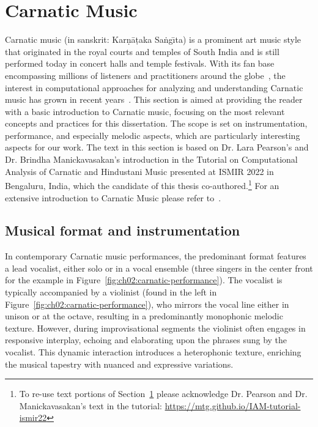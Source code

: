 \section{Carnatic Music}\label{ch02_sb:sec:carnatic}
Carnatic music (in sanskrit: Kar\d{n}\={a}\d{t}aka Sa\.{n}g\={\i}ta) is a prominent art music style that originated in the royal courts and temples of South India and is still performed today in concert halls and temple festivals. With its fan base encompassing millions of listeners and practitioners around the globe~\citep{gulati-mining}, the interest in computational approaches for analyzing and understanding Carnatic music has grown in recent years~\citep{tzanetakis-ethnomusicology}. This section is aimed at providing the reader with a basic introduction to Carnatic music, focusing on the most relevant concepts and practices for this dissertation. 
%
The scope is set on instrumentation, performance, and especially melodic aspects, which are particularly interesting aspects for our work.
%
The text in this section is based on Dr. Lara Pearson's and Dr. Brindha Manickavasakan's introduction in the Tutorial on Computational Analysis of Carnatic and Hindustani Music presented at ISMIR 2022 in Bengaluru, India, which the candidate of this thesis co-authored.\footnote{To re-use text portions of Section~\ref{ch02_sb:sec:carnatic} please acknowledge Dr. Pearson and Dr. Manickavasakan's text in the tutorial: \url{https://mtg.github.io/IAM-tutorial-ismir22}}
%
For an extensive introduction to Carnatic Music please refer to~\citep{carnatic-book}.


\subsection{Musical format and instrumentation}
In contemporary Carnatic music performances, the predominant format features a lead vocalist, either solo or in a vocal ensemble (three singers in the center front for the example in Figure~\ref{fig:ch02:carnatic-performance}). The vocalist is typically accompanied by a violinist (found in the left in Figure~\ref{fig:ch02:carnatic-performance}), who mirrors the vocal line either in unison or at the octave, resulting in a predominantly monophonic melodic texture. However, during improvisational segments
the violinist often engages in responsive interplay, echoing and elaborating upon the phrases sung by the vocalist. This dynamic interaction introduces a heterophonic texture, enriching the musical tapestry with nuanced and expressive variations.


